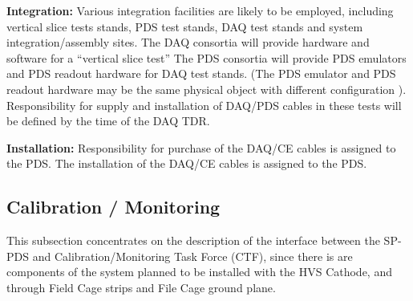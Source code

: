 \textbf{Integration:} Various integration facilities are likely to be employed, including vertical slice tests stands, PDS test stands, DAQ test stands and system integration/assembly sites. The DAQ consortia will provide hardware and software for a “vertical slice test” The PDS consortia will provide PDS emulators and PDS readout hardware for DAQ test stands. (The PDS emulator and PDS readout hardware may be the same physical object with different configuration ). Responsibility for supply and installation of DAQ/PDS cables in these tests will be defined by the time of the DAQ TDR.

\textbf{Installation: }Responsibility for purchase of the DAQ/CE cables is assigned to the PDS. The installation of the  DAQ/CE cables is assigned to the PDS.


\subsection{Calibration / Monitoring}
\label{sec:fdsp-pd-intfc-calib}

This subsection concentrates on the description of the interface between the SP-PDS and Calibration/Monitoring Task Force (CTF), since there is are components of the system planned to be installed with the HVS Cathode, and through Field Cage strips and File Cage ground plane.

